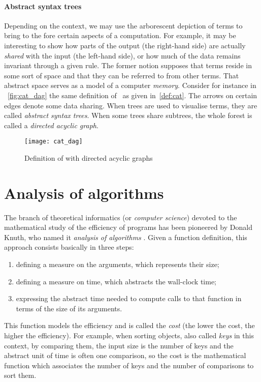 \paragraph{Abstract syntax trees}

Depending on the context, we may use the arborescent depiction of
terms to bring to the fore certain aspects of a computation. For
example, it may be interesting to show how parts of the output (the
right\hyp{}hand side) are actually \emph{shared} with
the input (the left\hyp{}hand side), or how much of the data remains
invariant through a given rule. The former notion supposes that terms
reside in some sort of space and that they can be referred to from
other terms. That abstract space serves as a model of a computer
\emph{memory}. Consider for instance in
\fig~\vref{fig:cat_dag} the same definition of~ as given
in~\eqref{def:cat}. The arrows on certain edges denote some data
sharing. When trees are used to visualise terms, they are called
\emph{abstract syntax trees}. When
some trees share subtrees, the whole forest is called a \emph{directed
acyclic graph}. 
\begin{figure}[H]
\centering
\texttt{[image: cat\_dag]}
\caption{Definition of  with directed acyclic graphs}
\label{fig:cat_dag}
\end{figure}

\section{Analysis of algorithms}

The branch of theoretical informatics (or \emph{computer science})
devoted to the mathematical study of the efficiency of programs has
been pioneered by Donald Knuth, who named it \emph{analysis of
  algorithms} \citep{SedgewickFlajolet_1996,Knuth_1997}. Given a
function definition, this approach consists basically in three steps:
\begin{enumerate}

  \item defining a measure on the arguments, which represents their
    size;

  \item defining a measure on time, which abstracts the
    wall\hyp{}clock time;

  \item expressing the abstract time needed to compute calls to that
    function in terms of the size of its arguments.

\end{enumerate}
This function models the efficiency and is called the
\emph{cost} (the lower the cost, the higher the
efficiency). For example, when sorting objects, also called
\emph{keys} in this context, by comparing
them, the input size is the number of keys and the abstract unit of
time is often one comparison, so the cost is the mathematical function
which associates the number of keys and the number of comparisons to
sort them.



